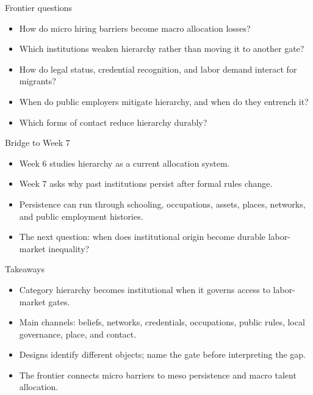 \documentclass[aspectratio=169,11pt]{beamer}
\begin{document}
\begin{frame}{Frontier questions}
\begin{itemize}
    \item How do micro hiring barriers become macro allocation losses?
    \item Which institutions weaken hierarchy rather than moving it to another gate?
    \item How do legal status, credential recognition, and labor demand interact for migrants?
    \item When do public employers mitigate hierarchy, and when do they entrench it?
    \item Which forms of contact reduce hierarchy durably?
\end{itemize}
\end{frame}

\begin{frame}{Bridge to Week 7}
\begin{itemize}
    \item Week 6 studies hierarchy as a current allocation system.
    \item Week 7 asks why past institutions persist after formal rules change.
    \item Persistence can run through schooling, occupations, assets, places, networks, and public employment histories.
    \item The next question: when does institutional origin become durable labor-market inequality?
\end{itemize}
\end{frame}

\begin{frame}{Takeaways}
\begin{itemize}
    \item Category hierarchy becomes institutional when it governs access to labor-market gates.
    \item Main channels: beliefs, networks, credentials, occupations, public rules, local governance, place, and contact.
    \item Designs identify different objects; name the gate before interpreting the gap.
    \item The frontier connects micro barriers to meso persistence and macro talent allocation.
\end{itemize}
\end{frame}
\end{document}
